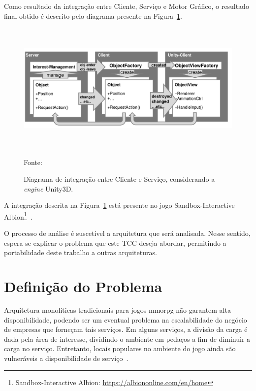 Como resultado da integração entre Cliente, Serviço e Motor Gráfico, o resultado final obtido é descrito pelo diagrama presente na Figura~\ref{fig:integracao_unity_albion}. %



\begin{figure}[htb!]
\caption{Diagrama de integração entre Cliente e Serviço, considerando a \textit{engine} Unity3D.}
\label{fig:integracao_unity_albion}
\includegraphics[height=6.5cm]{img/cap2/integracao_unity_albion.png}
\centering

Fonte:~\cite{albion_online_unite}
\end{figure}


A integração descrita na Figura~\ref{fig:integracao_unity_albion} está presente no jogo Sandbox-Interactive Albion\footnote{Sandbox-Interactive Albion: \url{https://albiononline.com/en/home}}~\cite{albion_online_unite}. %


O processo de análise é suscetível a arquitetura que será analisada.
%
Nesse sentido, espera-se explicar o problema que este TCC deseja abordar, permitindo a portabilidade deste trabalho a outras arquiteturas. %


\section{Definição do Problema}

Arquitetura monolíticas tradicionais para jogos \ac{mmorpg} não garantem alta disponibilidade, podendo ser um eventual problema na escalabilidade do negócio de empresas que forneçam tais serviços. %
%
Em alguns serviços, a divisão da carga é dada pela área de interesse, dividindo o ambiente em pedaços a fim de diminuir a carga no serviço.
%
Entretanto, locais populares no ambiente do jogo ainda são vulneráveis a disponibilidade de serviço~\cite{1417630}.


